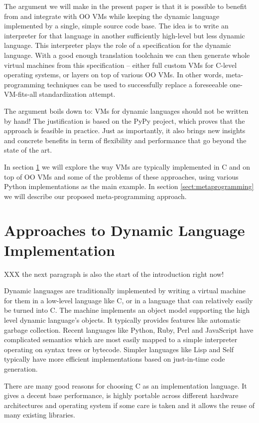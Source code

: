 \documentclass[utf8x]{llncs}
\begin{document}
The argument we will make in the present paper is that it is possible to
benefit from and integrate with OO VMs while keeping the dynamic
language implemented by a single, simple source code base.  The idea is
to write an interpreter for that language in another sufficiently
high-level but less dynamic language.  This interpreter plays the role
of a specification for the dynamic language.  With a good enough
translation toolchain we can then generate whole virtual machines from
this specification -- either full custom VMs for C-level operating
systems, or layers on top of various OO VMs.  In other words,
meta-programming techniques can be used to successfully replace a
foreseeable one-VM-fits-all standardization attempt.

The argument boils down to: VMs for dynamic languages should not be
written by hand!  The justification is based on the
PyPy project, which proves that the approach is
feasible in practice.  Just as importantly, it also brings new insights
and concrete benefits in term of flexibility and performance that go
beyond the state of the art.

In section \ref{sect:approaches} we will explore the way VMs are typically
implemented in C and on top of OO VMs and some of the problems of these
approaches, using various Python implementations as the main example. In
section \ref{sect:metaprogramming} we will describe our proposed
meta-programming approach.


\section{Approaches to Dynamic Language Implementation}
\label{sect:approaches}

XXX the next paragraph is also the start of the introduction right now!

Dynamic languages are traditionally implemented by writing a virtual
machine for them in a low-level language like C, or in a language that
can relatively easily be turned into C.  The machine implements an
object model supporting the high level dynamic language's objects.  It
typically provides features like automatic garbage collection.  Recent
languages like Python, Ruby, Perl and JavaScript have complicated
semantics which are most easily mapped to a simple interpreter operating
on syntax trees or bytecode. Simpler languages like Lisp and Self
typically have more efficient implementations based on just-in-time code
generation.

There are many good reasons for choosing C as an implementation language. It
gives a decent base performance, is highly portable across different hardware
architectures and operating system if some care is taken and it allows the reuse
of many existing libraries.
\end{document}
